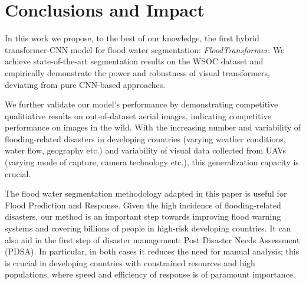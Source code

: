 \documentclass{article}
\begin{document}
\section{Conclusions and Impact}
In this work we propose, to the best of our knowledge, the first hybrid transformer-CNN model for flood water segmentation: \textit{FloodTransformer}. We achieve state-of-the-art segmentation results on the WSOC dataset and empirically demonstrate the power and robustness of visual transformers, deviating from pure CNN-based approaches.

We further validate our model's performance by demonstrating competitive qualitiative results on out-of-dataset aerial images, indicating competitive performance on images in the wild. With the increasing number and variability of flooding-related disasters in developing countries (varying weather conditions, water flow, geography etc.) and variability of visual data collected from UAVs (varying mode of capture, camera technology etc.), this generalization capacity is crucial. 


The flood water segmentation methodology adapted in this paper is useful for Flood Prediction and Response. Given the high incidence of flooding-related disasters, our method is an important step towards improving flood warning systems and covering billions of people in high-risk developing countries. It can also aid in the first step of disaster management: Post Disaster Needs Assessment (PDSA). In particular, in both cases it reduces the need for manual analysis; this is crucial in developing countries with constrained resources and high populations, where speed and efficiency of response is of paramount importance. 









\appendix



\newpage
{\small


}
\end{document}
